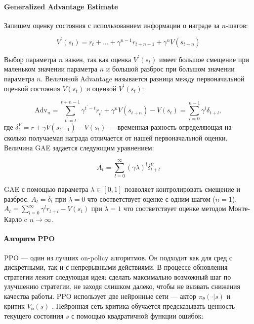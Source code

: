 \paragraph{Generalized Advantage Estimate}
Запишем оценку состояния с использованием информации о награде за $n$-шагов:

\begin{equation}
    V^{\prime}(s_t) = r_t + \ldots + \gamma^{n-1} r_{t+n-1} + \gamma^{n}V(s_{t+n})
\end{equation}

Выбор параметра $n$ важен, так как оценка $V^{\prime}(s_t)$ имеет большое смещение при маленьком значении параметра $n$ и большой разброс при большом значении параметра $n$. Величиной Advantage называется разница между первоначальной оценкой состояния $V(s_t)$ и оценкой $V^{\prime}(s_t)$:

\begin{equation}
    \mathrm{Adv}_n = \sum_{t^{\prime} = t}^{t+n-1} \gamma^{t^{\prime} - t}r_{t^{\prime}} + \gamma^{n}V(s_{t+n}) - V(s_t) = \sum_{l = 0}^{n-1}\gamma^l\delta_{t+l},
\end{equation}
где $\delta_t^V = r + \gamma V(s_{t+1}) - V(s_t)$ --- временная разность определяющая на сколько получаемая награда отличается от нашей первоначальной оценки. Величина GAE задается следующим уравнением: 

\begin{equation}
    A_t = \sum_{l = 0}^{\infty}(\gamma \lambda)^l \delta_{t+l}^V
\end{equation}

GAE с помощью параметра $\lambda \in [0, 1]$ позволяет контролировать смещение и разброс. $A_t = \delta_t$ при $\lambda = 0$ что соответствует оценке с одним шагом ($n = 1$). $A_t = \sum_{l=0}^{\infty} \gamma^lr_{t+l} - V(s_t)$ при $\lambda = 1$ что соответствует оценке методом Монте-Карло c $n \to \infty$. 

\paragraph{Алгоритм PPO}

PPO --- один из лучших on-policy алгоритмов. Он подходит как для сред с дискретными, так и с непрерывными действиями. В процессе обновления стратегии лежит следующая идея: сделать максимально возможный шаг по улучшению стратегии, не заходя слишком далеко, чтобы не вызвать снижения качества работы. PPO использует две нейронные сети --- актор $\pi_{\theta}(\cdot|s)$ и критик $V_{\phi}(s)$ \cite{Schulman2017ProximalPO}. Нейронная сеть критика обучается предсказывать ценность текущего состояния $s$ с помощью квадратичной функции ошибок: 

